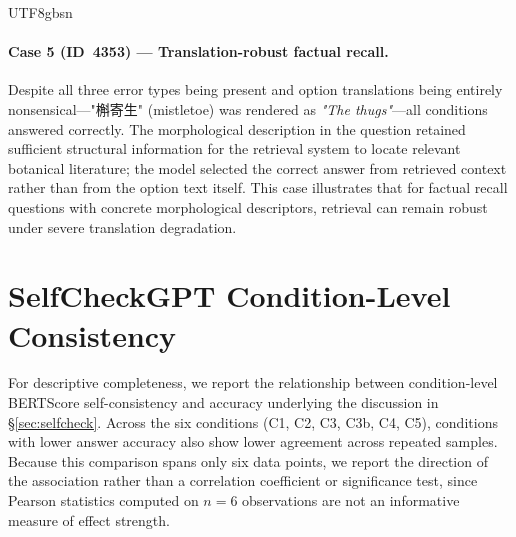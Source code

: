 \documentclass[11pt]{article}
\begin{document}
\begin{CJK}{UTF8}{gbsn}
\paragraph{Case 5 (ID~4353) --- Translation-robust factual recall.}
Despite all three error types being present and option translations being entirely nonsensical---"槲寄生" (mistletoe) was rendered as
\textit{"The thugs"}---all conditions answered correctly. The morphological description in the question retained sufficient structural information for the retrieval system to locate relevant botanical literature; the model selected the correct answer from retrieved context rather than from the option text itself. This case illustrates that for factual recall questions with concrete morphological descriptors, retrieval can remain robust under severe translation degradation.

\section{SelfCheckGPT Condition-Level Consistency}
\label{sec:appendix_selfcheck}
For descriptive completeness, we report the relationship between condition-level BERTScore self-consistency and accuracy underlying the discussion in  \S\ref{sec:selfcheck}. Across the six conditions (C1, C2, C3, C3b, C4, C5), conditions with lower answer accuracy also show lower agreement across repeated samples. Because this comparison spans only six data points, we report the direction of the association rather than a correlation coefficient or significance test, since Pearson statistics computed on $n=6$ observations are not an informative measure of effect strength.
\end{CJK}
\end{document}

